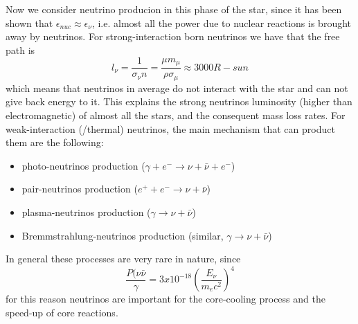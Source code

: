 \documentclass[main.tex]{subfiles}
\begin{document}
Now we consider neutrino producion in this phase of the star, since it has been shown that $\epsilon_{nuc}\approx\epsilon_\nu$, i.e. almost all the power due to nuclear reactions is brought away by neutrinos. For strong-interaction born neutrinos we have that the free path is
\begin{equation}
    l_\nu=\frac{1}{\sigma_\nu n}=\frac{\mu m_\mu}{\rho\sigma_\mu}\approx 3000 R-sun
\end{equation}
which means that neutrinos in average do not interact with the star and can not give back energy to it. This explains the strong neutrinos luminosity (higher than electromagnetic) of almost all the stars, and the consequent mass loss rates.
For weak-interaction (/thermal) neutrinos, the main mechanism that can product them are the following:
\begin{itemize}
    \item photo-neutrinos production ($\gamma+e^- \to \nu + \bar\nu +e^-$)
    \item pair-neutrinos production ($e^++e^- \to \nu + \bar\nu $)
    \item plasma-neutrinos production ($\gamma \to \nu + \bar\nu $)
    \item Bremmstrahlung-neutrinos production (similar, $\gamma \to \nu + \bar\nu $)
\end{itemize}
In general these processes are very rare in nature, since
\begin{equation}
    \frac{P(\nu\bar\nu}{\gamma}=3x10^{-18}\left(\frac{E_\nu}{m_e c^2}\right)^4
\end{equation}
for this reason neutrinos are important for the core-cooling process and the speed-up of core reactions.
\end{document}
